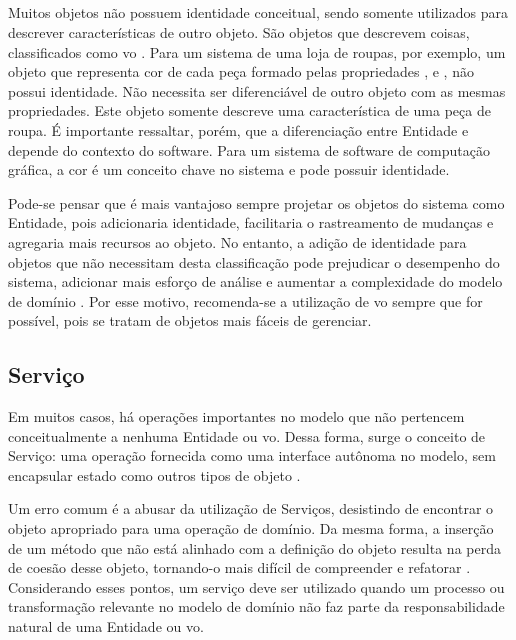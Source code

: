 \subsection{}
Muitos objetos não possuem identidade conceitual, sendo somente utilizados para descrever características de outro objeto. São objetos que descrevem coisas, classificados como \acrfull{vo} \cite{evans2004ddd}. Para um sistema de uma loja de roupas, por exemplo, um objeto que representa cor de cada peça formado pelas propriedades ,  e , não possui identidade. Não necessita ser diferenciável de outro objeto com as mesmas propriedades. Este objeto somente descreve uma característica de uma peça de roupa. É importante ressaltar, porém, que a diferenciação entre Entidade e  depende do contexto do software. Para um sistema de software de computação gráfica, a cor é um conceito chave no sistema e pode possuir identidade.

Pode-se pensar que é mais vantajoso sempre projetar os objetos do sistema como Entidade, pois adicionaria identidade, facilitaria o rastreamento de mudanças e agregaria mais recursos ao objeto. No entanto, a adição de identidade para objetos que não necessitam desta classificação pode prejudicar o desempenho do sistema, adicionar mais esforço de análise e aumentar a complexidade do modelo de domínio \cite{evans2004ddd}. Por esse motivo, recomenda-se a utilização de \acrshort{vo} sempre que for possível, pois se tratam de objetos mais fáceis de gerenciar.

\subsection{Serviço}
Em muitos casos, há operações importantes no modelo que não pertencem conceitualmente a nenhuma Entidade ou \acrshort{vo}. Dessa forma, surge o conceito de Serviço: uma operação fornecida como uma interface autônoma no modelo, sem encapsular estado como outros tipos de objeto \cite{evans2004ddd}.

Um erro comum é a abusar da utilização de Serviços, desistindo de encontrar o objeto apropriado para uma operação de domínio. Da mesma forma, a inserção de um método que não está alinhado com a definição do objeto resulta na perda de coesão desse objeto, tornando-o mais difícil de compreender e refatorar \cite{evans2004ddd}. Considerando esses pontos, um serviço deve ser utilizado quando um processo ou transformação relevante no modelo de domínio não faz parte da responsabilidade natural de uma Entidade ou \acrshort{vo}.

